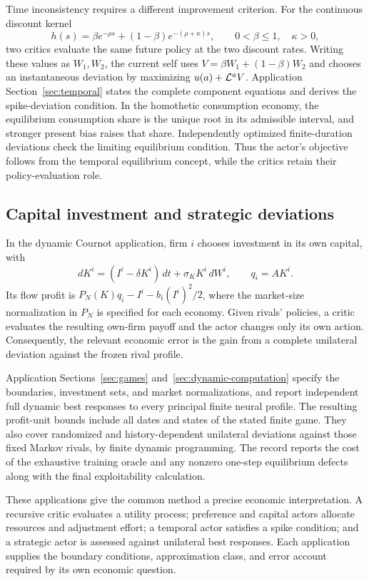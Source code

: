 Time inconsistency requires a different improvement criterion. For the continuous discount kernel
\[
 h(s)=\beta e^{-\rho s}+(1-\beta)e^{-(\rho+\kappa)s},
 \qquad 0<\beta\leq1,\quad\kappa>0,
\]
two critics evaluate the same future policy at the two discount rates. Writing these values as $W_1,W_2$, the current self uses $V=\beta W_1+(1-\beta)W_2$ and chooses an instantaneous deviation by maximizing $u(a)+\mathcal L^a V$. Application Section~\ref{sec:temporal} states the complete component equations and derives the spike-deviation condition. In the homothetic consumption economy, the equilibrium consumption share is the unique root in its admissible interval, and stronger present bias raises that share. Independently optimized finite-duration deviations check the limiting equilibrium condition. Thus the actor's objective follows from the temporal equilibrium concept, while the critics retain their policy-evaluation role.

\subsection{Capital investment and strategic deviations}
In the dynamic Cournot application, firm $i$ chooses investment in its own capital, with
\[
 dK^i=(I^i-\delta K^i)\,dt+\sigma_KK^i\,dW^i,
 \qquad q_i=AK^i.
\]
Its flow profit is $P_N(K)q_i-I^i-b_i(I^i)^2/2$, where the market-size normalization in $P_N$ is specified for each economy. Given rivals' policies, a critic evaluates the resulting own-firm payoff and the actor changes only its own action. Consequently, the relevant economic error is the gain from a complete unilateral deviation against the frozen rival profile.

Application Sections~\ref{sec:games} and~\ref{sec:dynamic-computation} specify the boundaries, investment sets, and market normalizations, and report independent full dynamic best responses to every principal finite neural profile. The resulting profit-unit bounds include all dates and states of the stated finite game. They also cover randomized and history-dependent unilateral deviations against those fixed Markov rivals, by finite dynamic programming. The record reports the cost of the exhaustive training oracle and any nonzero one-step equilibrium defects along with the final exploitability calculation.

These applications give the common method a precise economic interpretation. A recursive critic evaluates a utility process; preference and capital actors allocate resources and adjustment effort; a temporal actor satisfies a spike condition; and a strategic actor is assessed against unilateral best responses. Each application supplies the boundary conditions, approximation class, and error account required by its own economic question.
